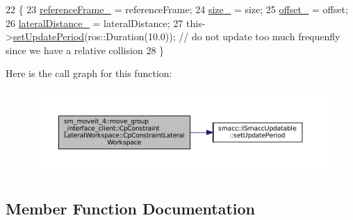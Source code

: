 \begin{DoxyCode}
22         \{
23             \hyperlink{classsm__moveit__4_1_1move__group__interface__client_1_1CpConstraintLateralWorkspace_ad295cea22a255b5181b75747a1c2de78}{referenceFrame\_} = referenceFrame;
24             \hyperlink{classsm__moveit__4_1_1move__group__interface__client_1_1CpConstraintLateralWorkspace_af029d4dd61252ad902e327c183c498d7}{size\_} = size;
25             \hyperlink{classsm__moveit__4_1_1move__group__interface__client_1_1CpConstraintLateralWorkspace_aeb3325a1b70163fbc32a6035a3b6c1a3}{offset\_} = offset;
26             \hyperlink{classsm__moveit__4_1_1move__group__interface__client_1_1CpConstraintLateralWorkspace_a7ecef38e94f47ca2a1a1ccd9994f7ac4}{lateralDistance\_} = lateralDistance;
27             this->\hyperlink{classsmacc_1_1ISmaccUpdatable_a88f3b092a81b2d8810a9776c8c69855b}{setUpdatePeriod}(ros::Duration(10.0)); \textcolor{comment}{// do not update too much frequenfly
       since we have a relative collision}
28         \}
\end{DoxyCode}
Here is the call graph for this function\+:
\nopagebreak
\begin{figure}[H]
\begin{center}
\leavevmode
\includegraphics[width=350pt]{classsm__moveit__4_1_1move__group__interface__client_1_1CpConstraintLateralWorkspace_a66a920bf3a53eae1c06cf8e1f2409cf8_cgraph}
\end{center}
\end{figure}


\subsection{Member Function Documentation}
\mbox{\label{classsm__moveit__4_1_1move__group__interface__client_1_1CpConstraintLateralWorkspace_aeeab3bc955c553843d0c23720bf78011}} 
